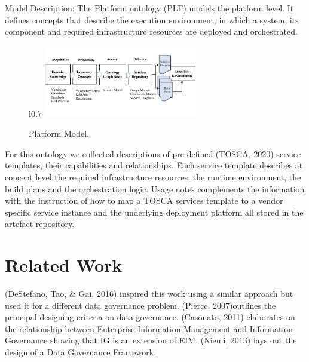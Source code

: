 \documentclass[runningheads]{llncs}
\begin{document}
Model Description: The Platform ontology (PLT) models the platform level. It defines concepts that describe the execution environment, in which a system, its component and required infrastructure resources are deployed and orchestrated. 

\begin{figure} {l}{0.7\textwidth}
\includegraphics[page=10,trim=0 1cm 0 1cm,clip, width=0.6\textwidth]{figs/IGSModelsMedium.pdf}
\caption{Platform Model.} \label{fig10}
\end{figure}

For this ontology we collected descriptions of pre-defined (TOSCA, 2020) service templates, their capabilities and relationships. Each service template describes at concept level the required infrastructure resources, the runtime environment, the build plans and the orchestration logic. Usage notes complements the information with the instruction of how to map a TOSCA services template to a vendor specific service instance and the underlying deployment platform all stored in the artefact repository.
\section{Related Work}
(DeStefano, Tao, \& Gai, 2016) inspired this work using a similar approach but used it for a different data governance problem. (Pierce, 2007)outlines the principal designing criteria on data governance. (Casonato, 2011) elaborates on the relationship between Enterprise Information Management and Information Governance showing that IG is an extension of EIM. (Niemi, 2013) lays out the design of a Data Governance Framework. 
\end{document}
